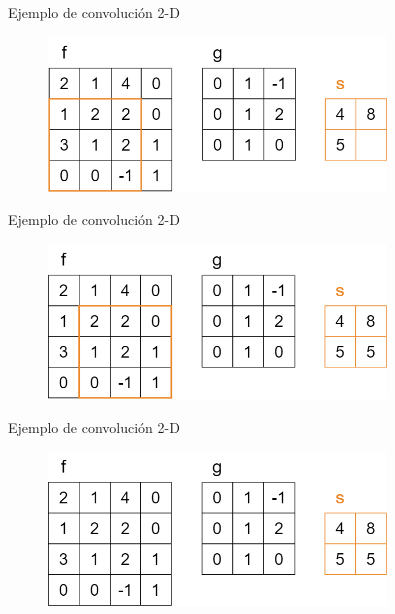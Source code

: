 \begin{frame}{Ejemplo de convolución 2-D}
\begin{figure}
    \centering
    \includegraphics[width=0.8\textwidth]{Slides/figures/Tema 2/Convolucion2D_4.png}
\end{figure}
\end{frame}

\begin{frame}{Ejemplo de convolución 2-D}
\begin{figure}
    \centering
    \includegraphics[width=0.8\textwidth]{Slides/figures/Tema 2/Convolucion2D_5.png}
\end{figure}
\end{frame}

\begin{frame}{Ejemplo de convolución 2-D}
\begin{figure}
    \centering
    \includegraphics[width=0.8\textwidth]{Slides/figures/Tema 2/Convolucion2D_Res.png}
\end{figure}
\end{frame}

